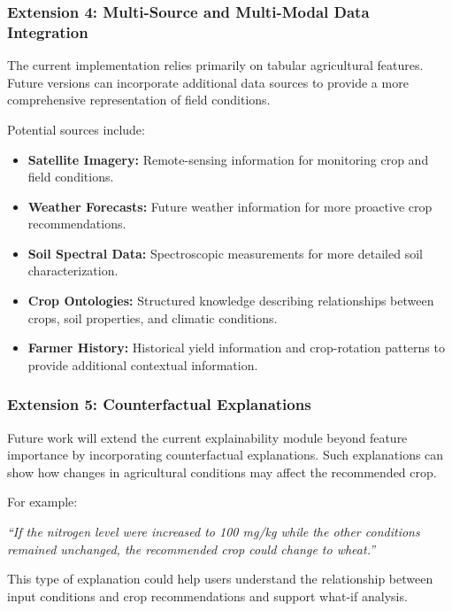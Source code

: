 \documentclass[journal]{IEEEtran}
\begin{document}
\subsubsection{Extension 4: Multi-Source and Multi-Modal Data Integration}

The current implementation relies primarily on tabular agricultural features. Future versions can incorporate additional data sources to provide a more comprehensive representation of field conditions.

Potential sources include:

\begin{itemize}[leftmargin=1.2em]
    \item \textbf{Satellite Imagery:} Remote-sensing information for monitoring crop and field conditions.

    \item \textbf{Weather Forecasts:} Future weather information for more proactive crop recommendations.

    \item \textbf{Soil Spectral Data:} Spectroscopic measurements for more detailed soil characterization.

    \item \textbf{Crop Ontologies:} Structured knowledge describing relationships between crops, soil properties, and climatic conditions.

    \item \textbf{Farmer History:} Historical yield information and crop-rotation patterns to provide additional contextual information.
\end{itemize}


\subsubsection{Extension 5: Counterfactual Explanations}

Future work will extend the current explainability module beyond feature importance by incorporating counterfactual explanations. Such explanations can show how changes in agricultural conditions may affect the recommended crop.

For example:

\emph{``If the nitrogen level were increased to 100 mg/kg while the other conditions remained unchanged, the recommended crop could change to wheat.''}

This type of explanation could help users understand the relationship between input conditions and crop recommendations and support what-if analysis.
\end{document}
